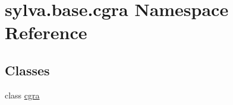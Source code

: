 \hypertarget{namespacesylva_1_1base_1_1cgra}{}\section{sylva.\+base.\+cgra Namespace Reference}
\label{namespacesylva_1_1base_1_1cgra}
\subsection*{Classes}
\begin{DoxyCompactItemize}
\item 
class \hyperlink{classsylva_1_1base_1_1cgra_1_1cgra}{cgra}
\end{DoxyCompactItemize}
